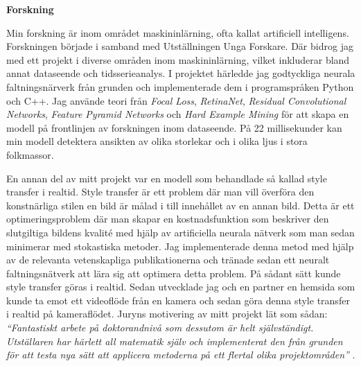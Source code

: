 \documentclass[11pt,a4paper]{article} %
\begin{document}
\begin{center}
\textbf{Forskning}
\end{center}

Min forskning är inom området maskininlärning, ofta kallat artificiell intelligens. Forskningen började i samband med Utställningen Unga Forskare. Där bidrog jag med ett projekt i diverse områden inom maskininlärning, vilket inkluderar bland annat dataseende och tidsserieanalys. I projektet härledde jag godtyckliga neurala faltningsnärverk från grunden och implementerade dem i programspråken Python och C++. Jag använde teori från \textit{Focal Loss}, \textit{RetinaNet}, \textit{Residual Convolutional Networks}, \textit{Feature Pyramid Networks} och \textit{Hard Example Mining} för att skapa en modell på frontlinjen av forskningen inom dataseende. På 22 millisekunder kan min modell detektera ansikten av olika storlekar och i olika ljus i stora folkmassor. 

En annan del av mitt projekt var en modell som behandlade så kallad style transfer i realtid. Style transfer är ett problem där man vill överföra den konstnärliga stilen en bild är målad i till innehållet av en annan bild. Detta är ett optimeringsproblem där man skapar en kostnadsfunktion som beskriver den slutgiltiga bildens kvalité med hjälp av artificiella neurala nätverk som man sedan minimerar med stokastiska metoder. Jag implementerade denna metod med hjälp av de relevanta vetenskapliga publikationerna och tränade sedan ett neuralt faltningsnätverk att lära sig att optimera detta problem. På sådant sätt kunde style transfer göras i realtid. Sedan utvecklade jag och en partner en hemsida som kunde ta emot ett videoflöde från en kamera och sedan göra denna style transfer i realtid på kameraflödet. Juryns motivering av mitt projekt lät som sådan: \textit{“Fantastiskt arbete på doktorandnivå som dessutom är helt självständigt. Utställaren har härlett all matematik själv och implementerat den från grunden för att testa nya sätt att applicera metoderna på ett flertal olika projektområden”} .
\end{document}

